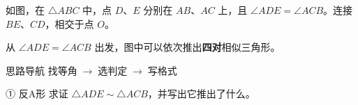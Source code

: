 \documentclass{exam-zh}
\begin{document}

\begin{eduProblemBlock}[例图]
\noindent
\begin{minipage}[t]{\dimexpr\linewidth-70mm-6mm\relax}
\vspace{0pt}
如图，在 $\triangle ABC$ 中，点 $D$、$E$ 分别在 $AB$、$AC$ 上，且 $\angle ADE=\angle ACB$。连接 $BE$、$CD$，相交于点 $O$。

从 $\angle ADE=\angle ACB$ 出发，图中可以依次推出\textbf{四对}相似三角形。

\end{minipage}\hfill
\begin{diagramcoltikz}{70mm}{先看公共顶点 $A$（公共角），再看对角线交点 $O$（对顶角）。}
}
\end{diagramcoltikz}
\end{eduProblemBlock}





\begin{eduAuxItem}{思路导航}
找等角$\;\to\;$选判定$\;\to\;$写格式\end{eduAuxItem}




\begin{eduSubQuestionItem}{① 反A形}
求证 $\triangle ADE\sim\triangle ACB$，并写出它推出了什么。\end{eduSubQuestionItem}

\begin{eduDualExplain}
  \begin{eduExplainLeft}
  \end{eduExplainLeft}

  \begin{eduExplainRight}
      
      
      
  \end{eduExplainRight}
\end{eduDualExplain}
\end{document}
